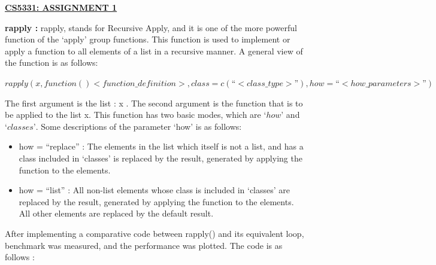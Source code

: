 \documentclass{article}
\begin{document}
\begin{center}
		\underline{\textbf{CS5331: ASSIGNMENT 1}}
\end{center}
	
\textbf{	rapply :}
	rapply, stands for Recursive Apply, and it is one of the more powerful function of the ‘apply’ group functions. This function is used to implement or apply a function to all elements of a list in a recursive manner. A general view of the function is as follows:
    
    $rapply(x, function()
    {<function\_definition>}, 
    class = c(“<class\_type>”), 
    how = “<how\_parameters>”)
    $
    
	The first argument is the list : x . The second argument is the function that is to be applied to the list x.
	This function has two basic modes, which are $‘how’$ and $‘classes’$. Some descriptions of the parameter ‘how’ is as follows: \leavevmode\newline
	
	\begin{itemize}
	 \item	how = “replace” : The elements in the list which itself is not a list, and has a class included in ‘classes’ is replaced by the result, generated by applying the function to the elements.
	 
	\item how = “list” : All non-list elements whose class is included in ‘classes’ are replaced by the result, generated by applying the function to the elements. All other elements are replaced by the default result.
	
    \end{itemize}
	
	After implementing a comparative code between rapply() and its equivalent loop, benchmark was measured, and the performance was plotted. The code is as follows : \\
\lstset{language=R}
\end{document}
